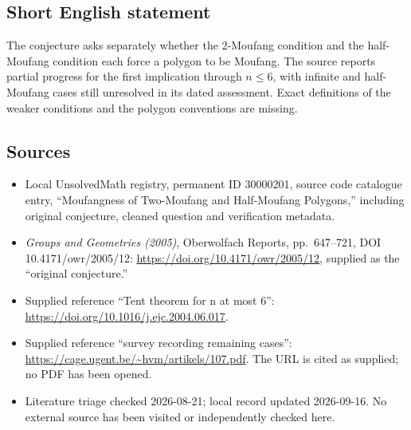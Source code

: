 \documentclass[11pt]{article}
\begin{document}
\subsection{Short English statement}
The conjecture asks separately whether the \(2\)-Moufang condition and the half-Moufang condition each force a polygon to be Moufang. The source reports partial progress for the first implication through \(n\leq6\), with infinite and half-Moufang cases still unresolved in its dated assessment. Exact definitions of the weaker conditions and the polygon conventions are missing.
\subsection{Sources}
\begin{itemize}
\item Local UnsolvedMath registry, permanent ID 30000201, source code catalogue entry, ``Moufangness of Two-Moufang and Half-Moufang Polygons,'' including original conjecture, cleaned question and verification metadata.
\item \emph{Groups and Geometries (2005)}, Oberwolfach Reports, pp.\ 647--721, DOI 10.4171/owr/2005/12: \url{https://doi.org/10.4171/owr/2005/12}, supplied as the ``original conjecture.''
\item Supplied reference ``Tent theorem for n at most 6'': \url{https://doi.org/10.1016/j.ejc.2004.06.017}.
\item Supplied reference ``survey recording remaining cases'': \url{https://cage.ugent.be/~hvm/artikels/107.pdf}. The URL is cited as supplied; no PDF has been opened.
\item Literature triage checked 2026-08-21; local record updated 2026-09-16. No external source has been visited or independently checked here.
\end{itemize}
\end{document}

